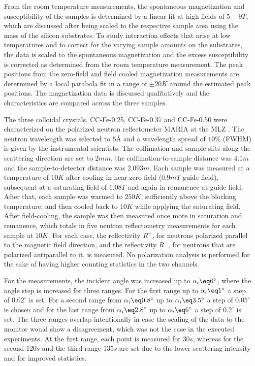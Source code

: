 \documentclass[\main/dresen_thesis.tex]{subfiles}
\begin{document}
    From the room temperature measurements, the spontaneous magnetization and susceptibility of the samples is determined by a linear fit at high fields of $5 - 9 \unit{T}$, which are discussed after being scaled to the respective sample area using the mass of the silicon substrates.
    To study interaction effects that arise at low temperatures and to correct for the varying sample amounts on the substrates, the data is scaled to the spontaneous magnetization and the excess susceptibility is corrected as determined from the room temperature measurement.
    The peak positions from the zero-field and field cooled magnetization measurements are determined by a local parabola fit in a range of $\pm 20 \unit{K}$ around the estimated peak positions.
    The magnetization data is discussed qualitatively and the characteristics are compared across the three samples.


    The three colloidal crystals, CC-Fe-0.25, CC-Fe-0.37 and CC-Fe-0.50 were characterized on the polarized neutron reflectometer MARIA at the MLZ .
    The neutron wavelength was selected to $5 \unit{\angstrom}$ and a wavelength spread of $10 \unit{\%}$ (FWHM) is given by the instrumental scientists.
    The collimation and sample slits along the scattering direction are set to $2 \unit{mm}$, the collimation-to-sample distance was $4.1 \unit{m}$ and the sample-to-detector distance was $2.093 \unit{m}$.
    Each sample was measured at a temperature of $10 \unit{K}$ after cooling in near zero field ($0.9 \unit{mT}$ guide field), subsequent at a saturating field of $1.08 \unit{T}$ and again in remanence at guide field.
    After that, each sample was warmed to $250 \unit{K}$, sufficiently above the blocking temperature, and then cooled back to $10 \unit{K}$ while applying the saturating field.
    After field-cooling, the sample was then measured once more in saturation and remanence, which totals in five neutron reflectometry measurements for each sample at $10 \unit{K}$.
    For each case, the reflectivity $R^{+}$, for neutrons polarized parallel to the magnetic field direction, and the reflectivity $R^{-}$, for neutrons that are polarized antiparallel to it, is measured.
    No polarization analysis is performed for the sake of having higher counting statistics in the two channels.

    For the measurements, the incident angle was increased up to $\alpha_i \eq 6 ^\circ$, where the angle step is increased for three ranges.
    For the first range up to $\alpha_i \eq 1 ^\circ$ a step of $0.02 ^\circ$ is set.
    For a second range from $\alpha_i \eq 0.8 ^\circ$ up to $\alpha_i \eq 3.5 ^\circ$ a step of $0.05 ^\circ$ is chosen and for the last range from $\alpha_i \eq 2.8 ^\circ$ up to $\alpha_i \eq 6 ^\circ$ a step of $0.2 ^\circ$ is set.
    The three ranges overlap intentionally in case the scaling of the data to the monitor would show a disagreement, which was not the case in the executed experiments.
    At the first range, each point is measured for $30 \unit{s}$, whereas for the second $120 \unit{s}$ and the third range $135 \unit{s}$ are set due to the lower scattering intensity and for improved statistics.
\end{document}
